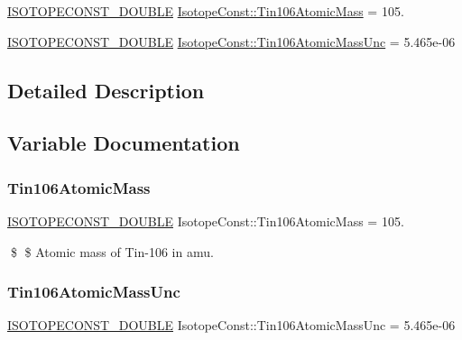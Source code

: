 \begin{DoxyCompactItemize}
\item 
\mbox{\hyperlink{group___isotope_const-_macros_ga8f45a7272ce02c0b4c65c44636ed719a}{I\+S\+O\+T\+O\+P\+E\+C\+O\+N\+S\+T\+\_\+\+D\+O\+U\+B\+LE}} \mbox{\hyperlink{group___isotope_const-_tin-_sn106_ga4369caef1d0d3ec6e36d5619d555dcce}{Isotope\+Const\+::\+Tin106\+Atomic\+Mass}} = 105.
\item 
\mbox{\hyperlink{group___isotope_const-_macros_ga8f45a7272ce02c0b4c65c44636ed719a}{I\+S\+O\+T\+O\+P\+E\+C\+O\+N\+S\+T\+\_\+\+D\+O\+U\+B\+LE}} \mbox{\hyperlink{group___isotope_const-_tin-_sn106_ga2ed2456690eec3f4af752c803649185a}{Isotope\+Const\+::\+Tin106\+Atomic\+Mass\+Unc}} = 5.\+465e-\/06
\end{DoxyCompactItemize}


\subsection{Detailed Description}


\subsection{Variable Documentation}
\mbox{\label{group___isotope_const-_tin-_sn106_ga4369caef1d0d3ec6e36d5619d555dcce}} 
\subsubsection{\texorpdfstring{Tin106\+Atomic\+Mass}{Tin106AtomicMass}}
{\footnotesize\ttfamily \mbox{\hyperlink{group___isotope_const-_macros_ga8f45a7272ce02c0b4c65c44636ed719a}{I\+S\+O\+T\+O\+P\+E\+C\+O\+N\+S\+T\+\_\+\+D\+O\+U\+B\+LE}} Isotope\+Const\+::\+Tin106\+Atomic\+Mass = 105.}

\$ \$ Atomic mass of Tin-\/106 in amu. \mbox{\label{group___isotope_const-_tin-_sn106_ga2ed2456690eec3f4af752c803649185a}} 
\subsubsection{\texorpdfstring{Tin106\+Atomic\+Mass\+Unc}{Tin106AtomicMassUnc}}
{\footnotesize\ttfamily \mbox{\hyperlink{group___isotope_const-_macros_ga8f45a7272ce02c0b4c65c44636ed719a}{I\+S\+O\+T\+O\+P\+E\+C\+O\+N\+S\+T\+\_\+\+D\+O\+U\+B\+LE}} Isotope\+Const\+::\+Tin106\+Atomic\+Mass\+Unc = 5.\+465e-\/06}

